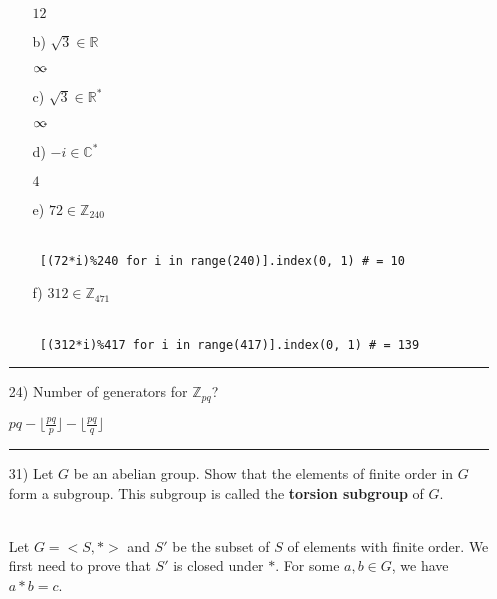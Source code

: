 \documentclass[11pt]{article}
\let\oriinfty=\infty
\def\infty{{\oriinfty\llap{\vrule height.24em depth-.2em width.2em}}}
\begin{document}
\begin{itemize}
\begin{itemize}
        \begin{solution}
            $12$
        \end{solution}
        \item[b)] $\sqrt{3}\in \mathbb{R}$
        \begin{solution}
            $\infty$
        \end{solution}
        \item[c)] $\sqrt{3}\in \mathbb{R}^*$
        \begin{solution}
            $\infty$
        \end{solution}
        \item[d)] $-i\in \mathbb{C}^*$
        \begin{solution}
            $4$
        \end{solution}
        \item[e)] $72 \in \mathbb{Z}_{240}$
        \begin{solution} \hfill \\
            \texttt{ [(72*i)\%240 for i in range(240)].index(0, 1) \# = 10}
        \end{solution}
        \item[f)] $312 \in \mathbb{Z}_{471}$
        \begin{solution} \hfill \\
            \texttt{ [(312*i)\%417 for i in range(417)].index(0, 1) \# = 139}
        \end{solution}
    \end{itemize}
    \vspace{6pt}
    \hrule
    \vspace{6pt}
    \item[24)] Number of generators for $\mathbb{Z}_{pq}$?
    \begin{solution}
        $pq - \lfloor\frac{pq}{p}\rfloor - \lfloor\frac{pq}{q}\rfloor$
    \end{solution}
    \vspace{6pt}
    \hrule
    \vspace{6pt}
    \item[31)] Let $G$ be an abelian group. Show that the elements of finite order in $G$ form a subgroup. This subgroup is called the \textbf{torsion subgroup} of $G$.
    \begin{solution} \hfill \\
        Let $G=<S,*>$ and $S'$ be the subset of $S$ of elements with finite order. We first need to prove that $S'$ is closed under $*$. For some $a, b\in G$, we have $a*b=c$.\\

\end{solution}
\end{itemize}
\end{document}
